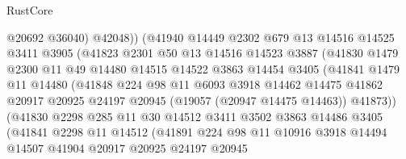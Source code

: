 \begin{lexlean}{RustCore}
\begin{coremodule}
                          @20692
                          @36040)
                        @42048))
                    (@41940
                      @14449
                      @2302
                      @679
                      @13
                      @14516
                      @14525
                      @3411
                      @3905
                      (@41823
                        @2301
                        @50
                        @13
                        @14516
                        @14523
                        @3887
                        (@41830
                          @1479
                          @2300
                          @11
                          @49
                          @14480
                          @14515
                          @14522
                          @3863
                          @14454
                          @3405
                          (@41841
                            @1479
                            @11
                            @14480
                            (@41848
                              @224
                              @98
                              @11
                              @6093
                              @3918
                              @14462
                              @14475
                              @41862
                              @20917
                              @20925
                              @24197
                              @20945
                              (@19057 (@20947 @14475 @14463))
                              @41873))
                          (@41830
                            @2298
                            @285
                            @11
                            @30
                            @14512
                            @3411
                            @3502
                            @3863
                            @14486
                            @3405
                            (@41841
                              @2298
                              @11
                              @14512
                              (@41891
                                @224
                                @98
                                @11
                                @10916
                                @3918
                                @14494
                                @14507
                                @41904
                                @20917
                                @20925
                                @24197
                                @20945

\end{coremodule}
\end{lexlean}
